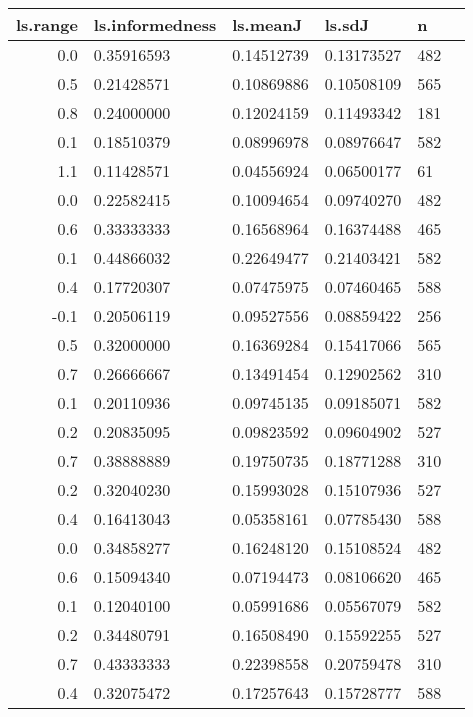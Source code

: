\documentclass[11pt]{article}
\begin{document}
    \begin{tabular}{r|lllll}
 ls.range & ls.informedness & ls.meanJ & ls.sdJ & n\\
\hline
	  0.0       & 0.35916593 & 0.14512739 & 0.13173527 & 482       \\
	  0.5       & 0.21428571 & 0.10869886 & 0.10508109 & 565       \\
	  0.8       & 0.24000000 & 0.12024159 & 0.11493342 & 181       \\
	  0.1       & 0.18510379 & 0.08996978 & 0.08976647 & 582       \\
	  1.1       & 0.11428571 & 0.04556924 & 0.06500177 &  61       \\
	  0.0       & 0.22582415 & 0.10094654 & 0.09740270 & 482       \\
	  0.6       & 0.33333333 & 0.16568964 & 0.16374488 & 465       \\
	  0.1       & 0.44866032 & 0.22649477 & 0.21403421 & 582       \\
	  0.4       & 0.17720307 & 0.07475975 & 0.07460465 & 588       \\
	 -0.1       & 0.20506119 & 0.09527556 & 0.08859422 & 256       \\
	  0.5       & 0.32000000 & 0.16369284 & 0.15417066 & 565       \\
	  0.7       & 0.26666667 & 0.13491454 & 0.12902562 & 310       \\
	  0.1       & 0.20110936 & 0.09745135 & 0.09185071 & 582       \\
	  0.2       & 0.20835095 & 0.09823592 & 0.09604902 & 527       \\
	  0.7       & 0.38888889 & 0.19750735 & 0.18771288 & 310       \\
	  0.2       & 0.32040230 & 0.15993028 & 0.15107936 & 527       \\
	  0.4       & 0.16413043 & 0.05358161 & 0.07785430 & 588       \\
	  0.0       & 0.34858277 & 0.16248120 & 0.15108524 & 482       \\
	  0.6       & 0.15094340 & 0.07194473 & 0.08106620 & 465       \\
	  0.1       & 0.12040100 & 0.05991686 & 0.05567079 & 582       \\
	  0.2       & 0.34480791 & 0.16508490 & 0.15592255 & 527       \\
	  0.7       & 0.43333333 & 0.22398558 & 0.20759478 & 310       \\
	  0.4       & 0.32075472 & 0.17257643 & 0.15728777 & 588       \\

\end{tabular}
\end{document}
